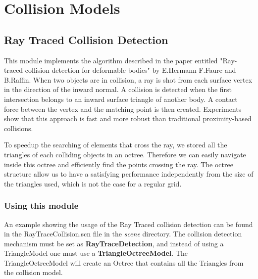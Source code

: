 \section{Collision Models}
\subsection{Ray Traced Collision Detection}
This module implements the algorithm described in the paper entitled "Ray-traced collision detection for deformable bodies" by E.Hermann F.Faure and B.Raffin. When two objects are in collision, a ray is shot from each surface vertex in the direction of the inward normal. A collision is detected when the first intersection belongs to an inward surface triangle of another body.  A contact force between the vertex and the matching point is then created. Experiments  show that this approach is fast and more robust than traditional proximity-based collisions.

 To speedup the  searching of elements that cross the ray,   we  stored all the triangles of each colliding objects in an  octree. Therefore we can easily navigate inside this octree and efficiently find the points crossing the ray. The octree structure allow us to have a satisfying performance independently from the size of the triangles used, which is not the case for  a regular grid.


\subsubsection{Using this module}
An example showing the usage of the Ray Traced collision detection can be found in the  RayTraceCollision.scn file in the \textit{scene} directory. The collision detection mechanism must be set as \textbf{RayTraceDetection}, and instead of using a TriangleModel one must use a \textbf{TriangleOctreeModel}. The TriangleOctreeModel will create an Octree that contains all the Triangles from the collision model. 
	
